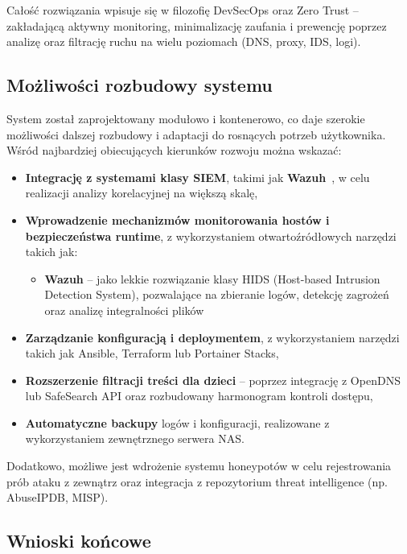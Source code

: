 \documentclass[
    left=2.5cm,         %
    right=2.5cm,        %
    top=2.5cm,          %
    bottom=3cm,         %
    bindingoffset=6mm,  %
    nohyphenation=true %
]{eiti/eiti-thesis} %
\begin{document}
Całość rozwiązania wpisuje się w filozofię DevSecOps\cite{microsoft-devsecops} oraz Zero Trust\cite{microsoft-zero-trust} – zakładającą aktywny monitoring, minimalizację zaufania i prewencję poprzez analizę oraz filtrację ruchu na wielu poziomach (DNS, proxy, IDS, logi).

\subsection{Możliwości rozbudowy systemu}

System został zaprojektowany modułowo i kontenerowo, co daje szerokie możliwości dalszej rozbudowy i adaptacji do rosnących potrzeb użytkownika. Wśród najbardziej obiecujących kierunków rozwoju można wskazać:
\begin{itemize}
    \item \textbf{Integrację z systemami klasy SIEM}, takimi jak \textbf{Wazuh}~\cite{wazuh_docs}, w celu realizacji analizy korelacyjnej na większą skalę,
    \item \textbf{Wprowadzenie mechanizmów monitorowania hostów i bezpieczeństwa runtime}, z wykorzystaniem otwartoźródłowych narzędzi takich jak:
    \begin{itemize}
        \item \textbf{Wazuh} – jako lekkie rozwiązanie klasy HIDS (Host-based Intrusion Detection System), pozwalające na zbieranie logów, detekcję zagrożeń oraz analizę integralności plików~\cite{wazuh_agent}
    \end{itemize}
    \item \textbf{Zarządzanie konfiguracją i deploymentem}, z wykorzystaniem narzędzi takich jak Ansible, Terraform lub Portainer Stacks,
    \item \textbf{Rozszerzenie filtracji treści dla dzieci} – poprzez integrację z OpenDNS lub SafeSearch API oraz rozbudowany harmonogram kontroli dostępu,
    \item \textbf{Automatyczne backupy} logów i konfiguracji, realizowane z wykorzystaniem zewnętrznego serwera NAS.
\end{itemize}

Dodatkowo, możliwe jest wdrożenie systemu honeypotów\cite{honeypot_wiki} w celu rejestrowania prób ataku z zewnątrz oraz integracja z repozytorium threat intelligence (np. AbuseIPDB, MISP).

\subsection{Wnioski końcowe}
\end{document}
